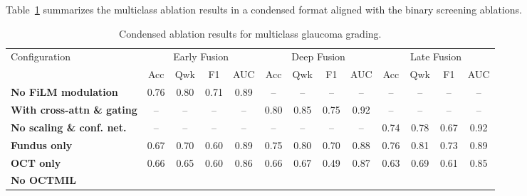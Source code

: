 \documentclass[preprint,12pt]{elsarticle}
\begin{document}
Table~\ref{tab:multiclass-ablation-condensed} summarizes the multiclass ablation results in a condensed format aligned with the binary screening ablations.

\begin{table}[!t]
    \centering
    \caption{Condensed ablation results for multiclass glaucoma grading.}
    \label{tab:multiclass-ablation-condensed}
    \scriptsize
    \setlength{\tabcolsep}{3pt}
    \begin{tabular}{|l|cccc|cccc|cccc|}
        \hline
        \multirow{2}{*}{Configuration}     &
        \multicolumn{4}{c|}{Early Fusion}  &
        \multicolumn{4}{c|}{Deep Fusion}   &
        \multicolumn{4}{c|}{Late Fusion}                                \\
        \cline{2-13}
                                           & Acc  & Qwk  & F1   & AUC &
        Acc                                & Qwk  & F1   & AUC  &
        Acc                                & Qwk  & F1   & AUC          \\
        \hline
        \textbf{No FiLM modulation}        &
        0.76                               & 0.80 & 0.71 & 0.89 &
        --                                 & --   & --   & --   &
        --                                 & --   & --   & --           \\
        \textbf{With cross-attn \& gating} &
        --                                 & --   & --   & --   &
        0.80                               & 0.85 & 0.75 & 0.92 &
        --                                 & --   & --   & --           \\
        \textbf{No scaling \& conf. net.}  &
        --                                 & --   & --   & --   &
        --                                 & --   & --   & --   &
        0.74                               & 0.78 & 0.67 & 0.92         \\
        \hline
        \textbf{Fundus only}               &
        0.67                               & 0.70 & 0.60 & 0.89 &
        0.75                               & 0.80 & 0.70 & 0.88 &
        0.76                               & 0.81 & 0.73 & 0.89         \\
        \textbf{OCT only}                  &
        0.66                               & 0.65 & 0.60 & 0.86 &
        0.66                               & 0.67 & 0.49 & 0.87 &
        0.63                               & 0.69 & 0.61 & 0.85         \\
        \hline
        \textbf{No OCTMIL}                 &

\end{tabular}
\end{table}
\end{document}
